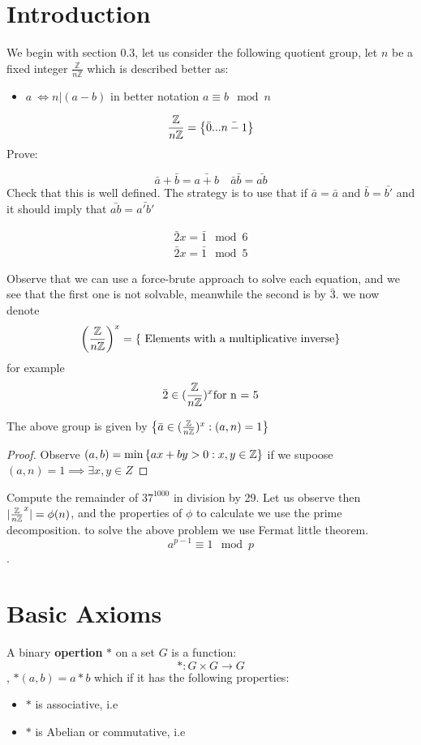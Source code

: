 \section{Introduction}
We begin with section 0.3, let us consider the following quotient group, let $n$ be a fixed integer $ \frac{\mathbb{Z}}{n \mathbb{Z}} $ which is described better as:
\begin{itemize}
	\item $ a ~ \iff n | (a-b) $ in better notation $ a \equiv b \mod{n} $
\end{itemize} 
\[ \frac{\mathbb{Z}}{n \mathbb{Z}} = \left\lbrace  \bar{0}... \bar{n-1}  \right\rbrace \]
Prove:

\[ \bar{a} + \bar{b}= \bar{a + b} \quad \bar{a}\bar{b} = \bar{ab} \]
Check that this is well defined. The strategy is to use that if  $ \bar{a} = \bar{a} $ and $ \bar{b} = \bar{b'} $ and it should imply that $ \bar{ab} = \bar{a'b' }$

\begin{example}
	\begin{align*}
	\bar{2}x = \bar{1} \mod{ 6} \\
	\bar{2}x = \bar{1} \mod{5}
	\end{align*}
\end{example}
Observe that we can use a force-brute approach to solve each equation, and we see that the first one is not solvable, meanwhile the second is by $ \bar{3} $. 
we now denote
\[ \left( \frac{\mathbb{Z}}{n \mathbb{Z}} \right)^x = \left\lbrace  \textrm{ Elements with a multiplicative inverse} \right\rbrace \]
for example
\[  \bar{2} \in (\frac{\mathbb{Z}}{n \mathbb{Z}})^x \textrm{for n = 5} \]

\begin{thm}
	The above group is given by $ \left\lbrace \bar{a} \in (\frac{\mathbb{Z}}{n \mathbb{Z}})^x : (a,n) = 1 \right\rbrace$
\end{thm}
\begin{proof}
	Observe $ (a,b) = \textrm{min} \left\lbrace ax + by > 0 : x,y \in \mathbb{Z} \right\rbrace $
	if we supoose $ (a,n) = 1 \implies \exists x,y\in Z $
\end{proof}
\begin{example}
	Compute the remainder of $ 37^{1000} $ in division by 29.
	Let us observe then $ | \frac{\mathbb{Z}}{n \mathbb{Z}}^x | = \phi(n) $, and the properties of $ \phi $ to calculate we use the prime decomposition.
	to solve the above problem we use Fermat little theorem.
	\[ a^{p-1} \equiv 1 \mod{p} \].
\end{example}
\section{Basic Axioms}
\begin{define}
	A binary \textbf{opertion} $ * $ on a set $G$ is a function:
	\[ *: G \times G\rightarrow G \], $*(a,b) = a * b $ which if it  has the following properties:
	\begin{itemize}
		\item $*$ is associative, i.e
		\item $*$ is Abelian or commutative, i.e
	\end{itemize}
\end{define}

